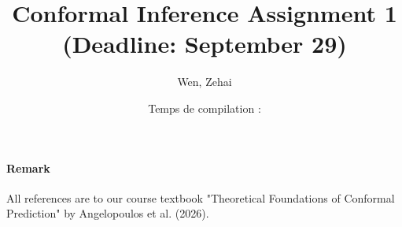 \documentclass[../main.tex]{subfiles}
\title{Conformal Inference Assignment 1 \\ (Deadline: September 29)}
\author{Wen, Zehai }
\date{Temps de compilation : \DTMnow}
\begin{document}
\maketitle

\paragraph{Remark}
All references are to our course textbook "Theoretical Foundations of Conformal Prediction"
by Angelopoulos et al. (2026).










\end{document}
